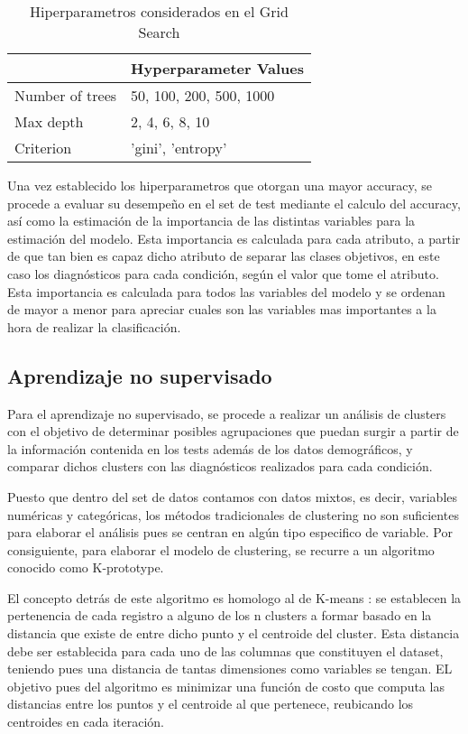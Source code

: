  \begin{table}[ht]
\centering
\caption{Hiperparametros considerados en el Grid Search}
 \begin{tabular}{ll}
\toprule
{} &    Hyperparameter Values \\
\midrule
Number of trees &  50, 100, 200, 500, 1000 \\
Max depth       &           2, 4, 6, 8, 10 \\
Criterion       &        'gini', 'entropy' \\
\bottomrule
\end{tabular}
\label{table:hyperparameters}
\end{table}%

Una vez establecido los hiperparametros que otorgan una mayor accuracy, se procede a evaluar su desempeño en el set de test mediante el calculo del accuracy, así como la estimación de la importancia de las distintas variables para la estimación del modelo. Esta importancia es calculada para cada atributo, a partir de que tan bien es capaz dicho atributo de separar las clases objetivos, en este caso los diagnósticos para cada condición, según el valor que tome el atributo. Esta importancia es calculada para todos las variables del modelo y se ordenan de mayor a menor para apreciar cuales son las variables mas importantes a la hora de realizar la clasificación.

 
\subsection{Aprendizaje no supervisado}

Para el aprendizaje no supervisado, se procede a realizar un análisis de clusters con el objetivo de determinar posibles agrupaciones que puedan surgir a partir de la información contenida en los tests además de los datos demográficos, y comparar dichos clusters con las diagnósticos realizados para cada condición.

 \medbreak

Puesto que dentro del set de datos contamos  con datos mixtos, es decir, variables numéricas y categóricas, los métodos tradicionales de clustering no son suficientes para elaborar el análisis pues se centran en algún tipo especifico de variable. Por consiguiente, para elaborar el modelo de clustering, se recurre a un algoritmo conocido como  K-prototype.

El concepto detrás de este algoritmo es homologo al de K-means \cite{huang1998extensions} : se establecen la pertenencia de cada registro a alguno de los n clusters a formar basado en la distancia que existe de entre dicho punto y el centroide del cluster. Esta distancia debe ser establecida para cada uno de las columnas que constituyen el dataset, teniendo pues una distancia de tantas dimensiones como variables se tengan. EL objetivo pues del algoritmo es minimizar una función de costo que computa las distancias entre los puntos y el centroide al que pertenece, reubicando los centroides en cada iteración. 

